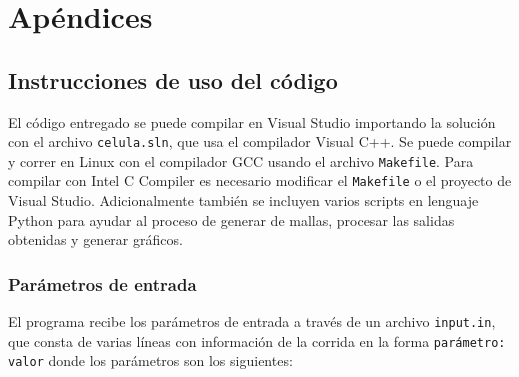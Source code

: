 
\chapter{Apéndices} \label{chap:uso}

\section*{Instrucciones de uso del código}

El código entregado se puede compilar en Visual Studio importando la solución con el archivo \texttt{celula.sln}, que usa el compilador Visual C++. Se puede compilar y correr en Linux con el compilador GCC usando el archivo \texttt{Makefile}. Para compilar con Intel C Compiler es necesario modificar el \texttt{Makefile} o el proyecto de Visual Studio. Adicionalmente también se incluyen varios scripts en lenguaje Python para ayudar al proceso de generar de mallas, procesar las salidas obtenidas y generar gráficos.

\subsection*{Parámetros de entrada}

El programa recibe los parámetros de entrada a través de un archivo \texttt{input.in}, que consta de varias líneas con información de la corrida en la forma \texttt{parámetro: valor} donde los parámetros son los siguientes:


